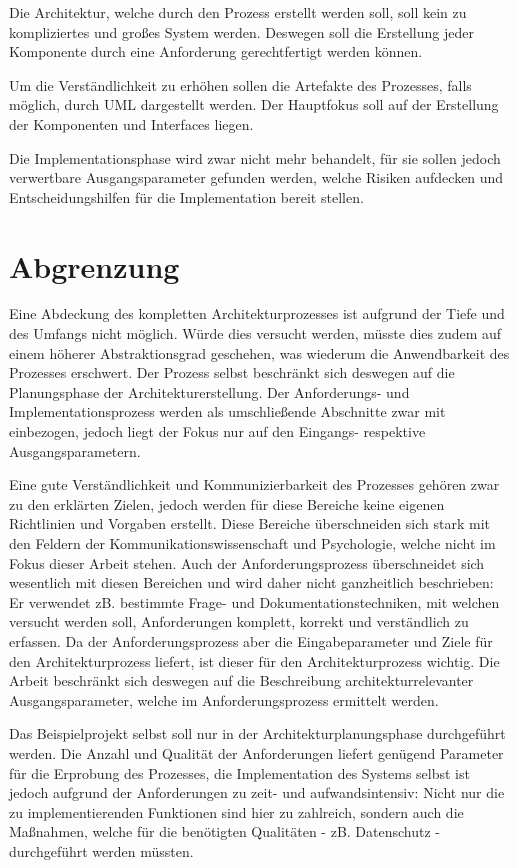 Die Architektur, welche durch den Prozess erstellt werden soll, soll kein zu kompliziertes und großes System werden. Deswegen soll die Erstellung jeder Komponente durch eine Anforderung gerechtfertigt werden können.

Um die Verständlichkeit zu erhöhen sollen die Artefakte des Prozesses, falls möglich, durch UML dargestellt werden. Der Hauptfokus soll auf der Erstellung der Komponenten und Interfaces liegen.

Die Implementationsphase wird zwar nicht mehr behandelt, für sie sollen jedoch verwertbare Ausgangsparameter gefunden werden, welche Risiken aufdecken und Entscheidungshilfen für die Implementation bereit stellen.


\section{Abgrenzung}
Eine Abdeckung des kompletten Architekturprozesses ist aufgrund der Tiefe und des Umfangs nicht möglich. Würde dies versucht werden, müsste dies zudem auf einem  höherer Abstraktionsgrad geschehen, was wiederum die Anwendbarkeit des Prozesses erschwert. Der Prozess selbst beschränkt sich deswegen auf die Planungsphase der Architekturerstellung. Der Anforderungs- und Implementationsprozess werden als umschließende Abschnitte zwar mit einbezogen, jedoch liegt der Fokus nur auf den Eingangs- respektive Ausgangsparametern.

Eine gute Verständlichkeit und Kommunizierbarkeit des Prozesses gehören zwar zu den erklärten Zielen, jedoch werden für diese Bereiche keine eigenen Richtlinien und Vorgaben erstellt. Diese Bereiche überschneiden sich stark mit den Feldern der Kommunikationswissenschaft und Psychologie, welche nicht im Fokus dieser Arbeit stehen. Auch der Anforderungsprozess überschneidet sich wesentlich mit diesen Bereichen und wird daher nicht ganzheitlich beschrieben: Er verwendet zB. bestimmte Frage- und Dokumentationstechniken, mit welchen versucht werden soll, Anforderungen komplett, korrekt und verständlich zu erfassen. Da der Anforderungsprozess aber die Eingabeparameter und Ziele für den Architekturprozess liefert, ist dieser für den Architekturprozess wichtig. Die Arbeit beschränkt sich deswegen auf die Beschreibung architekturrelevanter Ausgangsparameter, welche im Anforderungsprozess ermittelt werden.

Das Beispielprojekt selbst soll nur in der Architekturplanungsphase durchgeführt werden. Die Anzahl und Qualität der Anforderungen liefert genügend Parameter für die Erprobung des Prozesses, die Implementation des Systems selbst ist jedoch aufgrund der Anforderungen zu zeit- und aufwandsintensiv: Nicht nur die zu implementierenden Funktionen sind hier zu zahlreich, sondern auch die Maßnahmen, welche für die benötigten Qualitäten - zB. Datenschutz - durchgeführt werden müssten.

